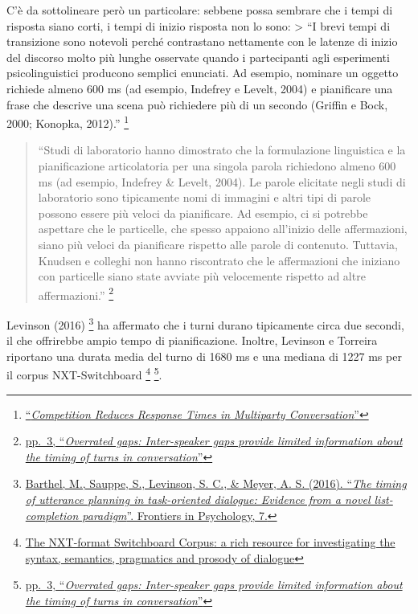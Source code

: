 \documentclass[
]{article}
\begin{document}
C'è da sottolineare però un particolare: sebbene possa sembrare che i tempi di risposta siano corti, i tempi di inizio risposta non lo sono: \textgreater{} ``I brevi tempi di transizione sono notevoli perché contrastano nettamente con le latenze di inizio del discorso molto più lunghe osservate quando i partecipanti agli esperimenti psicolinguistici producono semplici enunciati. Ad esempio, nominare un oggetto richiede almeno 600 ms (ad esempio, Indefrey e Levelt, 2004) e pianificare una frase che descrive una scena può richiedere più di un secondo (Griffin e Bock, 2000; Konopka, 2012).'' \footnote{\href{DOC/fpsyg-12-693124.pdf}{``\emph{Competition Reduces Response Times in Multiparty Conversation}''}}

\begin{quote}
``Studi di laboratorio hanno dimostrato che la formulazione linguistica e la pianificazione articolatoria per una singola parola richiedono almeno 600 ms (ad esempio, Indefrey \& Levelt, 2004). Le parole elicitate negli studi di laboratorio sono tipicamente nomi di immagini e altri tipi di parole possono essere più veloci da pianificare. Ad esempio, ci si potrebbe aspettare che le particelle, che spesso appaiono all'inizio delle affermazioni, siano più veloci da pianificare rispetto alle parole di contenuto. Tuttavia, Knudsen e colleghi non hanno riscontrato che le affermazioni che iniziano con particelle siano state avviate più velocemente rispetto ad altre affermazioni.'' \footnote{\href{DOC/1-s2.0-S0010027722000257-main.pdf}{pp.~3, ``\emph{Overrated gaps: Inter-speaker gaps provide limited information about the timing of turns in conversation}''}}
\end{quote}

Levinson (2016) \footnote{\href{https://doi.org/10.3389/fpsyg.2016.01858}{Barthel, M., Sauppe, S., Levinson, S. C., \& Meyer, A. S. (2016). ``\emph{The timing of utterance planning in task-oriented dialogue: Evidence from a novel list-completion paradigm}''. Frontiers in Psychology, 7.}} ha affermato che i turni durano tipicamente circa due secondi, il che offrirebbe ampio tempo di pianificazione. Inoltre, Levinson e Torreira riportano una durata media del turno di 1680 ms e una mediana di 1227 ms per il corpus NXT-Switchboard \footnote{\href{DOC/The_NXT_format_Switchboard_Corpus_a_rich_resource_for_investigating_the_syntax_semantics_pragmatics_and_prosody_of_dialogue.pdf}{The NXT-format Switchboard Corpus: a rich resource for investigating the syntax, semantics, pragmatics and prosody of dialogue}} \footnote{\href{DOC/1-s2.0-S0010027722000257-main.pdf}{pp.~3, ``\emph{Overrated gaps: Inter-speaker gaps provide limited information about the timing of turns in conversation}''}}.
\end{document}
